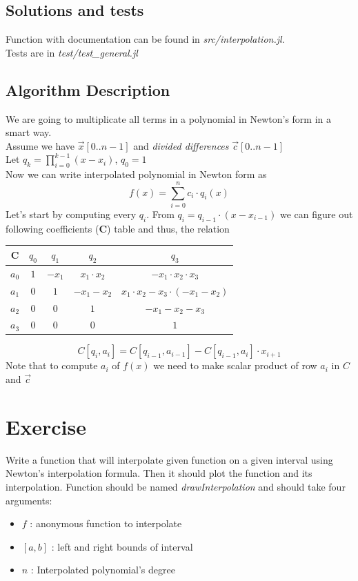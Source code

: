 \documentclass[11pt]{article}
\begin{document}
\subsection*{Solutions and tests}
Function with documentation can be found in \textit{src/interpolation.jl}.\\
Tests are in \textit{test/test\_general.jl}
\subsection*{Algorithm Description}
We are going to multiplicate all terms in a polynomial in Newton's form in a smart way.\\
Assume we have $\vec{x}[0..n-1]$ and \textit{divided differences} $\vec{c}[0..n-1]$\\
Let $q_k = \prod^{k-1} _{i=0}(x-x_i)$, $q_0 = 1$\\
Now we can write interpolated polynomial in Newton form as
\begin{equation*}
    f(x) = \sum^n_{i=0}{c_i \cdot q_i(x)}
\end{equation*}
Let's start by computing every $q_i$. From $q_i = q_{i-1} \cdot (x-x_{i-1})$ 
we can figure out following coefficients (\textbf{C}) table and thus, the relation
\begin{table}[!ht] 
    \centering
    \begin{tabular}{|c|c|c|c|c|}
    \hline
        \textbf{C} & \textbf{$q_0$} & \textbf{$q_1$} & \textbf{$q_2$} & \textbf{$q_3$} \\ \hline
        \textbf{$a_0$} & $1$ & $-x_1$ & $x_1 \cdot x_2$ & $- x_1 \cdot x_2 \cdot x_3$ \\ \hline
        \textbf{$a_1$} & 0 & $1$ & $-x_1 - x_2$ & $x_1 \cdot x_2 - x_3 \cdot (-x_1 - x_2)$ \\ \hline
        \textbf{$a_2$} & 0 & 0 & $1$ & $- x_1 - x_2 - x_3$ \\ \hline
        \textbf{$a_3$} & 0 & 0 & 0 & $1$ \\ \hline
    \end{tabular}
\end{table}
\begin{equation*}
    C[q_i, a_i] = C[q_{i-1}, a_{i-1}] - C[q_{i-1}, a_i] \cdot x_{i+1}
\end{equation*}
Note that to compute $a_i$ of $f(x)$ we need to make scalar product of row $a_i$ in $C$ and $\vec{c}$
\section{Exercise}
Write a function that will interpolate given function on a given interval using Newton's interpolation formula.
Then it should plot the function and its interpolation. Function should be named \textit{drawInterpolation} and should take four arguments:
\begin{itemize}
    \item $f$ : anonymous function to interpolate 
    \item $[a, b]$ : left and right bounds of interval
    \item $n$ : Interpolated polynomial's degree
\end{itemize}
\end{document}
